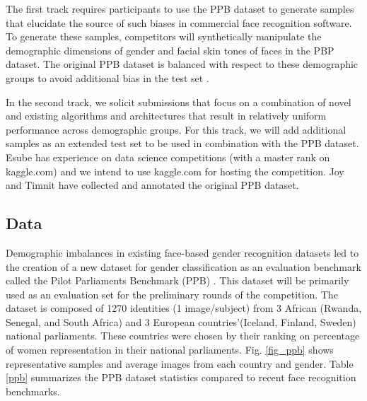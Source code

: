 \documentclass[11pt, oneside]{article}
\makeatletter
\let\@internalcite\cite
\def\cite{\def\citeauthoryear##1##2{##1, ##2}\@internalcite}
\makeatother
\begin{document}
The first track requires participants to use the PPB dataset to generate 
samples that elucidate the source of such biases in commercial face recognition 
software. To generate these samples, competitors will synthetically manipulate 
the demographic dimensions of gender and facial skin tones of faces in the PBP 
dataset. The original PPB dataset is balanced with respect to these 
demographic groups to avoid additional bias in the test set 
\cite{buolamwini2018gender}.

In the second track, we solicit submissions that focus on a combination of 
novel and existing algorithms and architectures that result in relatively 
uniform performance across demographic groups. For this track, we will add 
additional samples as an extended test set to be used in combination with the 
PPB dataset. Esube has experience on data science competitions (with a master 
rank on kaggle.com) and we intend to use kaggle.com for hosting the 
competition. Joy and Timnit have collected and annotated the original PPB 
dataset.

\subsection{Data}

Demographic imbalances in existing face-based gender recognition datasets led 
to the creation of a new dataset for gender classification as an evaluation benchmark 
called the Pilot Parliaments Benchmark (PPB) \cite{buolamwini2018gender}. This 
dataset will be primarily used as an evaluation set for the preliminary rounds 
of the competition. The dataset is composed of 1270 identities (1 
image/subject) from 3 African (Rwanda, Senegal, and South Africa) and 3 
European countries'(Iceland, Finland, Sweden) national parliaments. These 
countries were chosen by their ranking on percentage of women representation in 
their national parliaments. Fig. \ref{fig_ppb} shows representative samples and 
average images from each country and gender. Table \ref{ppb} summarizes the PPB 
dataset statistics compared to recent face recognition benchmarks.
\end{document}
